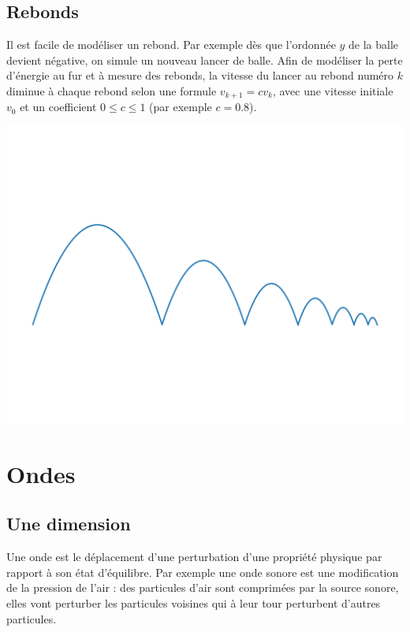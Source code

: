 \documentclass[11pt,class=report,crop=false]{standalone}
\begin{document}
\subsection{Rebonds}

Il est facile de modéliser un rebond. Par exemple dès que l'ordonnée $y$ de la balle devient négative, on simule un nouveau lancer de balle. Afin de modéliser la perte d'énergie au fur et à mesure des rebonds, la vitesse du lancer au rebond numéro $k$ diminue à chaque rebond selon une formule $v_{k+1} = c v_k$, avec une vitesse initiale $v_0$ et un coefficient $0 \le c \le 1$ (par exemple $c=0.8$).

\begin{center}
	\includegraphics[scale=\myscale,scale=0.5,trim={0 3cm 0 3cm},clip]{figures/balle-rebond}
\end{center}



\section{Ondes}


\subsection{Une dimension}

Une onde est le déplacement d'une perturbation d'une propriété physique par rapport à son état d'équilibre.
Par exemple une onde sonore est une modification de la pression de l'air : des particules d'air sont comprimées par la source sonore, elles vont perturber les particules voisines qui à leur tour perturbent d'autres particules.
\end{document}
